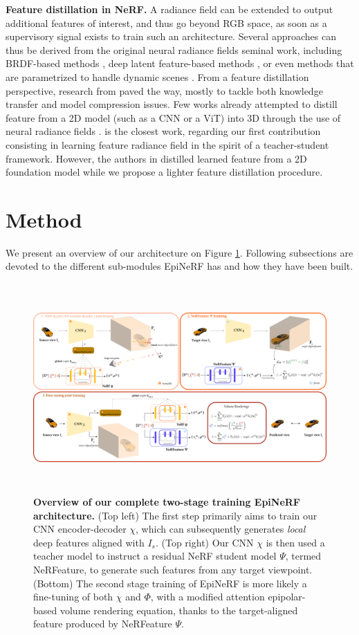 \noindent\textbf{Feature distillation in NeRF.} A radiance field can be extended to output additional features of interest, and thus go beyond RGB space, as soon as a supervisory signal exists to train such an architecture. Several approaches can thus be derived from the original neural radiance fields seminal work, including BRDF-based methods \citep{boss2021nerd,verbin2022ref}, deep latent feature-based methods \citep{kobayashi2022decomposing,ye2023featurenerf,chan2023genvs}, or even methods that are parametrized to handle dynamic scenes \citep{pumarola2021d,yan2023nerf}. From a feature distillation perspective, research from \citep{hinton2015distilling} paved the way, mostly to tackle both knowledge transfer and model compression issues. Few works already attempted to distill feature from a 2D model (such as a CNN or a ViT) into 3D through the use of neural radiance fields \citep{kobayashi2022decomposing, tschernezki2022neural}. \citep{ye2023featurenerf} is the closest work, regarding our first contribution consisting in learning feature radiance field in the spirit of a teacher-student framework. However, the authors in \citep{ye2023featurenerf} distilled learned feature from a 2D foundation model \citep{oquab2023dinov2} while we propose a lighter feature distillation procedure. 

\section{Method}

We present an overview of our architecture on Figure \ref{fig:overview}. Following subsections are devoted to the different sub-modules EpiNeRF has and how they have been built.
\begin{figure}[htb!]
    \center
  \includegraphics[height=8cm]{images/epinerf/overview_architecture.png}
  \caption{\textbf{Overview of our complete two-stage training EpiNeRF architecture.} (Top left) The first step primarily aims to train our CNN encoder-decoder $\chi$, which can subsequently generates \textit{local} deep features aligned with $I_{s}$. (Top right) Our CNN $\chi$ is then used a teacher model to instruct a residual NeRF student model $\Psi$, termed NeRFeature, to generate such features from any target viewpoint. (Bottom) The second stage training of EpiNeRF is more likely a fine-tuning of both $\chi$ and $\Phi$, with a modified attention epipolar-based volume rendering equation, thanks to the target-aligned feature produced by NeRFeature $\Psi$.}
  \label{fig:overview}
\end{figure}
